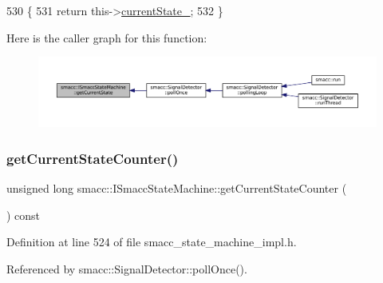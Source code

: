\begin{DoxyCode}
530   \{
531     \textcolor{keywordflow}{return} this->\hyperlink{classsmacc_1_1ISmaccStateMachine_a9c6e7745205bcce80a301f2fbe8f7e99}{currentState\_};
532   \}
\end{DoxyCode}
Here is the caller graph for this function\+:
\nopagebreak
\begin{figure}[H]
\begin{center}
\leavevmode
\includegraphics[width=350pt]{classsmacc_1_1ISmaccStateMachine_a610d09dc5341fb63732be713c21fbe86_icgraph}
\end{center}
\end{figure}
\mbox{\label{classsmacc_1_1ISmaccStateMachine_aad27c0182b53245d0aded22e63cd83bd}} 
\subsubsection{\texorpdfstring{get\+Current\+State\+Counter()}{getCurrentStateCounter()}}
{\footnotesize\ttfamily unsigned long smacc\+::\+I\+Smacc\+State\+Machine\+::get\+Current\+State\+Counter (\begin{DoxyParamCaption}{ }\end{DoxyParamCaption}) const\hspace{0.3cm}{\ttfamily [inline]}}



Definition at line 524 of file smacc\+\_\+state\+\_\+machine\+\_\+impl.\+h.



Referenced by smacc\+::\+Signal\+Detector\+::poll\+Once().


